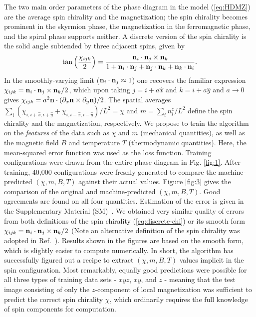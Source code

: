 \documentclass[reprint,amsmath,amssymb,aps,showpacs,superscriptaddress,prl]{revtex4-1}
\newcommand{\ba}{\begin{eqnarray}}
\newcommand{\ea}{\end{eqnarray}}
\renewcommand{\v}[1]{{\bf #1}}
\begin{document}
The two main order parameters of the phase diagram in the model (\ref{eq:HDMZ}) are the average spin chirality and the magnetization; the spin chirality becomes prominent in the skyrmion phase, the magnetization in the ferromagnetic phase, and the spiral phase supports neither. A discrete version of the spin chirality is the solid angle subtended by three adjacent spins, given by~\cite{berg81,zang16,han-book}
%
\ba \tan \left( {\chi_{ijk} \over 2} \right)  = {\v n_i \cdot \v n_j \times \v n_k \over 1 + \v n_i \cdot \v n_j + \v n_j \cdot \v n_k + \v n_k \cdot \v n_i }  . \label{eq:discrete-chi}\ea
%
In the smoothly-varying limit ($\v n_i \cdot \v n_j \approx 1$) one recovers the familiar expression $\chi_{ijk} = \v n_i \cdot \v n_j \times \v n_k /2$, which upon taking $j = i + a \hat{x}$ and $k = i + a\hat{y}$ and $a\rightarrow 0$ gives $\chi_{ijk} = a^2 \v n \cdot (\partial_x \v n \times \partial_y \v n)/2$. The spatial averages $\sum_{i} ( \chi_{i, i+\hat{x}, i+\hat{y}} + \chi_{i, i-\hat{x}, i-\hat{y}} ) /L^2 =\chi$ and $m =\sum_i n_i^z /L^2$  define the spin chirality and the magnetization, respectively. We propose to train the algorithm on the {\it features} of the data such as $\chi$ and $m$ (mechanical quantities), as well as the magnetic field $B$ and temperature $T$ (thermodynamic quantities). Here, the mean-squared error function was used as the loss function. Training configurations were drawn from the entire phase diagram in Fig. \ref{fig:1}. After training, 40,000 configurations were freshly generated to compare the machine-predicted $(\chi,m, B, T)$ against their actual values. Figure \ref{fig:3} gives the comparison of the original and machine-predicted $(\chi, m, B, T)$. Good agreements are found on all four quantities. Estimation of the error is given in the Supplementary Material (SM)~\cite{SM}. We obtained very similar quality of errors from both definitions of the spin chirality (\ref{eq:discrete-chi}) or its smooth form $\chi_{ijk} = \v n_i \cdot \v n_j \times \v n_k /2$ (Note an alternative definition of the spin chirality was adopted in Ref.~\cite{pujol15}). Results shown in the figures are based on the smooth form, which is slightly easier to compute numerically. In short, the algorithm has successfully figured out a recipe to extract $(\chi, m, B, T)$ values implicit in the spin configuration. Most remarkably, equally good predictions were possible for all three types of training data sets -  $xyz$, $xy$, and $z$ - meaning that the test image consisting of only the $z$-component of local magnetization was sufficient to predict the correct spin chirality $\chi$, which ordinarily requires the full knowledge of spin components for computation.
\end{document}
